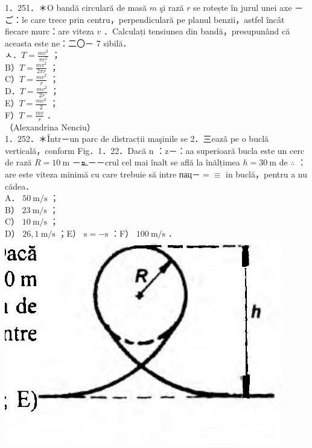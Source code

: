 \documentclass[10pt]{article}
\begin{document}
1．251．＊O bandă circulară de masă $m$ şi rază $r$ se rotește în jurul unei axe －ご：le care trece prin centru，perpendiculară pe planul benzii，astfel încât fiecare murc：are viteza $v$ ．Calculați tensiunea din bandă，presupunând că aceasta este ne：二〇－ 7 sibilă．\\
ㅅ．$T=\frac{m v^{2}}{\pi r^{2}}$ ；\\
B）$T=\frac{m v^{2}}{2 \pi r}$ ；\\
C）$T=\frac{m v^{2}}{r}$ ；\\
D．$T=\frac{m v^{2}}{2 r}$ ；\\
E）$T=\frac{m v^{2}}{2}$ ；\\
F）$T=\frac{m v}{r}$ ．\\
（Alexandrina Nenciu）\\
1．252．＊Într－un parc de distracții maşinile se 2．三eazã pe o buclă verticală，conform Fig．1．22．Dacă n ：z－：aa superioară bucla este un cerc de rază $R=10 \mathrm{~m}$ －உ－－crul cel mai înalt se află la înălțimea $h=30 \mathrm{~m}$ de $\therefore$ ：are este viteza minimă cu care trebuie să intre пац－$=\equiv$ in buclă，pentru a nu cădea．\\
A． $50 \mathrm{~m} / \mathrm{s}$ ；\\
B） $23 \mathrm{~m} / \mathrm{s}$ ；\\
C） $10 \mathrm{~m} / \mathrm{s}$ ；\\
D） $26,1 \mathrm{~m} / \mathrm{s}$ ；E） $\mathrm{s}=-\mathrm{s}$ ：F） $100 \mathrm{~m} / \mathrm{s}$ ．\\
\includegraphics[max width=\textwidth, center]{2025_07_01_5b3ff9fa0d508c8e9f17g-057(2)}
\end{document}
